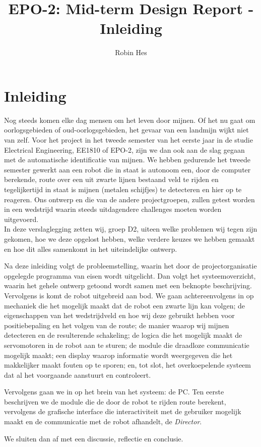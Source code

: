 \documentclass{report}
\title{EPO-2: Mid-term Design Report - Inleiding}
\author{Robin Hes}
\begin{document}
\chapter{Inleiding}
\label{ch:inleiding}

Nog steeds komen elke dag mensen om het leven door mijnen. Of het nu gaat om oorlogsgebieden of oud-oorlogsgebieden, het gevaar van een landmijn wijkt niet van zelf. Voor het project in het tweede semester van het eerste jaar in de studie Electrical Engineering, EE1810 of EPO-2, zijn we dan ook aan de slag gegaan met de automatische identificatie van mijnen. We hebben gedurende het tweede semester gewerkt aan een robot die in staat is autonoom een, door de computer berekende, route over een uit zwarte lijnen bestaand veld te rijden en tegelijkertijd in staat is mijnen (metalen schijfjes) te detecteren en hier op te reageren. Ons ontwerp en die van de andere projectgroepen, zullen getest worden in een wedstrijd waarin steeds uitdagendere challenges moeten worden uitgevoerd.
\\

\noindent
In deze verslaglegging zetten wij, groep D2, uiteen welke problemen wij tegen zijn gekomen, hoe we deze opgelost hebben, welke verdere keuzes we hebben gemaakt en hoe dit alles samenkomt in het uiteindelijke ontwerp.

Na deze inleiding volgt de probleemstelling, waarin het door de projectorganisatie opgelegde programma van eisen wordt uitgelicht. Dan volgt het systeemoverzicht, waarin het gehele ontwerp getoond wordt samen met een beknopte beschrijving.
Vervolgens is komt de robot uitgebreid aan bod. We gaan achtereenvolgens in op mechaniek die het mogelijk maakt dat de robot een zwarte lijn kan volgen; de eigenschappen van het wedstrijdveld en hoe wij deze gebruikt hebben voor positiebepaling en het volgen van de route; de manier waarop wij mijnen detecteren en de resulterende schakeling; de logica die het mogelijk maakt de servomotoren in de robot aan te sturen; de module die draadloze communicatie mogelijk maakt; een display waarop informatie wordt weergegeven die het makkelijker maakt fouten op te sporen; en, tot slot, het overkoepelende systeem dat al het voorgaande aanstuurt en controleert.

Vervolgens gaan we in op het brein van het systeem: de PC. Ten eerste beschrijven we de module die de door de robot te rijden route berekent, vervolgens de  grafische interface die interactiviteit met de gebruiker mogelijk maakt en de communicatie met de robot afhandelt, de \textit{Director}.

We sluiten dan af met een discussie, reflectie en conclusie.
\end{document}
